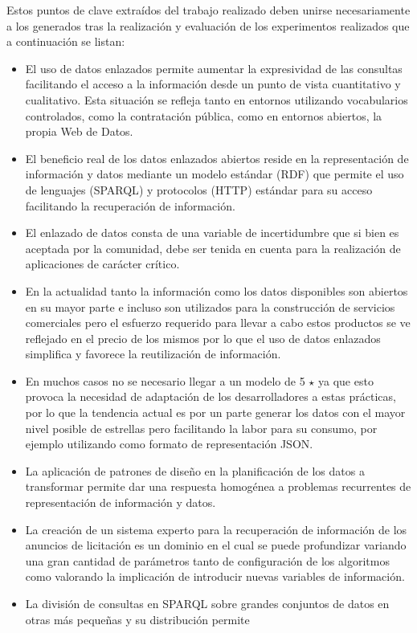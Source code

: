 Estos puntos de clave extraídos del trabajo realizado deben unirse necesariamente a los generados tras la realización y evaluación 
de los experimentos realizados que a continuación se listan:
\begin{itemize}
 \item El uso de datos enlazados permite aumentar la expresividad de las consultas facilitando el acceso a la información 
desde un punto de vista cuantitativo y cualitativo. Esta situación se refleja tanto en entornos utilizando vocabularios 
controlados, como la contratación pública, como en entornos abiertos, la propia Web de Datos.
\item El beneficio real de los datos enlazados abiertos reside en la representación de información y datos mediante un modelo estándar (\gls{RDF}) que permite el uso 
de lenguajes (\gls{SPARQL}) y protocolos (\gls{HTTP}) estándar para su acceso facilitando la recuperación de información.
\item El enlazado de datos consta de una variable de incertidumbre que si bien es aceptada por la comunidad, debe ser tenida en cuenta 
para la realización de aplicaciones de carácter crítico.
\item En la actualidad tanto la información como los datos disponibles son abiertos en su mayor parte e incluso son utilizados 
para la construcción de servicios comerciales pero el esfuerzo requerido para llevar a cabo estos productos 
se ve reflejado en el precio de los mismos por lo que el uso de datos enlazados simplifica y favorece la reutilización de información.
\item En muchos casos no se necesario llegar a un modelo de 5 $\star$ ya que esto provoca la necesidad de adaptación de los 
desarrolladores a estas prácticas, por lo que la tendencia actual es por un parte generar los datos con el mayor nivel posible 
de estrellas pero facilitando la labor para su consumo, por ejemplo utilizando como formato de representación JSON.
\item La aplicación de patrones de diseño en la planificación de los datos a transformar permite dar una respuesta 
homogénea a problemas recurrentes de representación de información y datos.
\item La creación de un sistema experto para la recuperación de información de los anuncios de licitación es un dominio 
en el cual se puede profundizar variando una gran cantidad de parámetros tanto de configuración de los algoritmos como 
valorando la implicación de introducir nuevas variables de información.
\item La división de consultas en SPARQL sobre grandes conjuntos de datos en otras más pequeñas y su distribución permite 

\end{itemize}
